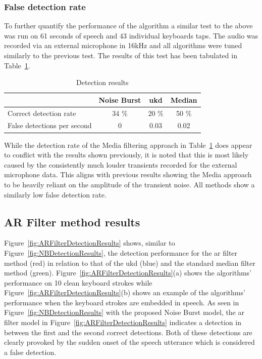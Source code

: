 \subsubsection{False detection rate}
To further quantify the performance of the algorithm a similar test to the above was run on 61 seconds of speech and 43 individual keyboards taps. The audio was recorded via an external microphone in 16kHz and all algorithms were tuned similarly to the previous test. The results of this test has been tabulated in Table~\ref{table:NBResultsTest}.

\begin{table}
\caption{Detection results}
\centering
\begin{tabular}{|l | c c c|}
\hline
                            & Noise Burst   & \gls{ukd}       & Median        \\
 \hline
 Correct detection rate     & 34 \%         & 20 \%     & 50 \%         \\
 False detections per second& 0             & 0.03      & 0.02          \\
 \hline
 \end{tabular}
 \label{table:NBResultsTest}
\end{table}

While the detection rate of the Media filtering approach in Table~\ref{table:NBResultsTest} does appear to conflict with the results shown previously, it is noted that this is most likely caused by the consistently much louder transients recorded for the external microphone data. This aligns with previous results showing the Media approach to be heavily reliant on the amplitude of the transient noise. All methods show a similarly low false detection rate. 

\subsection{AR Filter method results}
Figure~\ref{fig:ARFilterDetectionResults} shows, similar to Figure~\ref{fig:NBDetectionResults}, the detection performance for the \gls{ar} filter method (red) in relation to that of the \gls{ukd}\cite{Subramanya2007} (blue) and the standard median filter method (green). Figure~\ref{fig:ARFilterDetectionResults}(a) shows the algorithms' performance on 10 clean keyboard strokes while Figure~\ref{fig:ARFilterDetectionResults}(b) shows an example of the algorithms' performance when the keyboard strokes are embedded in speech. As seen in Figure~\ref{fig:NBDetectionResults} with the proposed Noise Burst model, the \gls{ar} filter model in Figure~\ref{fig:ARFilterDetectionResults} indicates a detection in between the first and the second correct detections. Both of these detections are clearly provoked by the sudden onset of the speech utterance which is considered a false detection.

